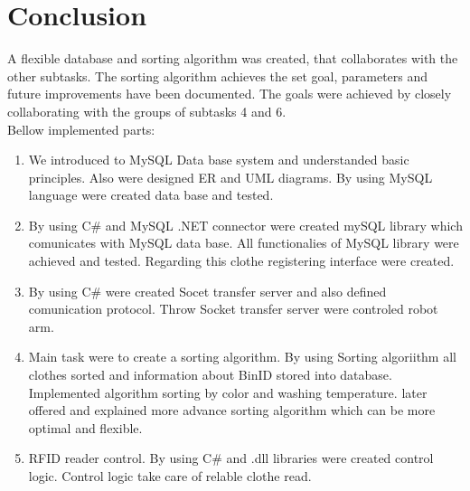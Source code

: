 \section{Conclusion}

A flexible database and sorting algorithm was created, that collaborates with the other subtasks. The sorting algorithm achieves the set goal, parameters and future improvements have been documented. The goals were achieved by closely collaborating with the groups of subtasks 4 and 6. 
\\
Bellow implemented parts:
\begin{enumerate}
	\item We introduced to MySQL Data base system and understanded basic principles. Also were designed ER and UML diagrams. By using MySQL language were created data base and tested.
	\item By using C\# and MySQL .NET connector were created mySQL library which comunicates with MySQL data base. All functionalies of MySQL library were achieved and tested. Regarding this clothe registering interface were created.
	\item By using C\# were created Socet transfer server and also defined comunication protocol. Throw Socket transfer server were controled robot arm.
	\item Main task were to create a sorting algorithm. By using Sorting algoriithm all clothes sorted and information about BinID stored into database. Implemented algorithm sorting by color and washing temperature. later offered and explained more advance sorting algorithm which can be more optimal and flexible.
	\item RFID reader control. By using C\# and .dll libraries were created control logic. Control logic take care of relable clothe read.
\end{enumerate}